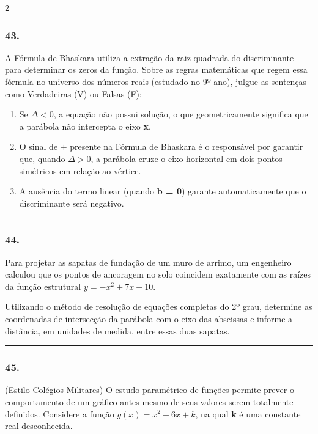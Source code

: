 \documentclass[twoside, 10pt, a4paper]{article}
\newlength{\espacoPreQuestao}
\newlength{\espacoQuestao}
\begin{document}
\begin{multicols*}{2}
\subsubsection*{43.} A Fórmula de Bhaskara utiliza a extração da raiz quadrada do discriminante para determinar os zeros da função. Sobre as regras matemáticas que regem essa fórmula no universo dos números reais (estudado no 9º ano), julgue as sentenças como Verdadeiras (V) ou Falsas (F):

\begin{enumerate}[label=\Roman*.]
    \item Se $\Delta < 0$, a equação não possui solução, o que geometricamente significa que a parábola não intercepta o eixo \textbf{x}.
    \item O sinal de $\pm$ presente na Fórmula de Bhaskara é o responsável por garantir que, quando $\Delta > 0$, a parábola cruze o eixo horizontal em dois pontos simétricos em relação ao vértice.
    \item A ausência do termo linear (quando \textbf{b = 0}) garante automaticamente que o discriminante será negativo.
\end{enumerate}
\par\vspace{\espacoQuestao}

\noindent\textcolor{CorLinha}{\rule{\linewidth}{0.5pt}} 
\par\vspace{\espacoPreQuestao}
\subsubsection*{44.} Para projetar as sapatas de fundação de um muro de arrimo, um engenheiro calculou que os pontos de ancoragem no solo coincidem exatamente com as raízes da função estrutural $y = -x^2 + 7x - 10$.

Utilizando o método de resolução de equações completas do 2º grau, determine as coordenadas de intersecção da parábola com o eixo das abscissas e informe a distância, em unidades de medida, entre essas duas sapatas.
\par\vspace{\espacoQuestao}

\noindent\textcolor{CorLinha}{\rule{\linewidth}{0.5pt}} 
\par\vspace{\espacoPreQuestao}
\subsubsection*{45.} (Estilo Colégios Militares) O estudo paramétrico de funções permite prever o comportamento de um gráfico antes mesmo de seus valores serem totalmente definidos. Considere a função $g(x) = x^2 - 6x + k$, na qual \textbf{k} é uma constante real desconhecida.


\end{multicols*}
\end{document}
